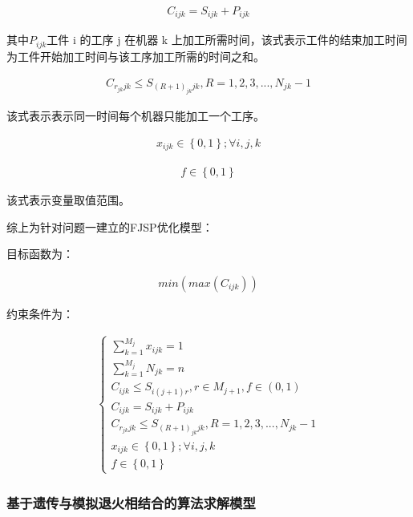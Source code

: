 \documentclass{whutmod}
\begin{document}
\begin{spacing}{1.2}
\begin{gather}
C_{ijk} = S_{ijk} +  P_{ijk} 
\end{gather}

其中$P_{ijk}$工件 i 的工序 j 在机器 k 上加工所需时间，该式表示工件的结束加工时间为工件开始加工时间与该工序加工所需的时间之和。

\begin{gather}
C_{r_{jk} jk} \le  S_{\left ( R+1 \right )_{jk}  jk} , R=1,2,3,...,N_{jk} -1
\end{gather}

该式表示表示同一时间每个机器只能加工一个工序。

\begin{gather}
x_{ijk} \in \left \{ 0,1 \right \} ;\forall i,j,k  
\end{gather}

\begin{gather}
f \in \left \{ 0,1 \right \}  
\end{gather}

该式表示变量取值范围。

综上为针对问题一建立的FJSP优化模型：

目标函数为：

\begin{gather}
		min\left ( max\left ( C_{ijk}  \right )  \right ) 
	\end{gather}

 约束条件为：

 \begin{gather}
		\left\{\begin{matrix}   \sum_{k=1}^{M_{j}}x_{ijk} =1 \\    \sum_{k=1}^{M_{j}}N_{jk} =n \\C_{ijk} \le S_{i\left ( j+1 \right )r} ,r\in M_{j+1} ,f\in ( 0,1)\\C_{ijk} = S_{ijk} +  P_{ijk} \\ C_{r_{jk} jk} \le  S_{\left ( R+1 \right )_{jk}  jk} , R=1,2,3,...,N_{jk} -1 \\x_{ijk} \in \left \{ 0,1 \right \} ;\forall i,j,k  \\f \in \left \{ 0,1 \right \}  \end{matrix}\right. 
	\end{gather}
    
	\subsubsection{基于遗传与模拟退火相结合的算法求解模型}


\end{spacing}
\end{document}
